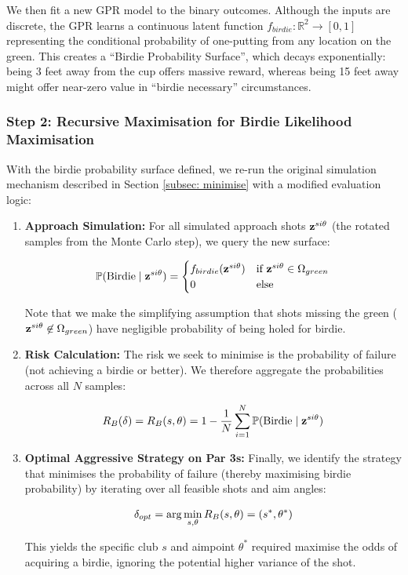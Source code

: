 \documentclass[11pt, letterpaper]{article}
\begin{document}
We then fit a new GPR model to the binary outcomes. Although the inputs are discrete, the GPR learns a continuous latent function $f_{birdie}: \mathbb{R}^2 \to [0,1] $ representing the conditional probability of one-putting from any location on the green. This creates a ``Birdie Probability Surface'', which decays exponentially: being 3 feet away from the cup offers massive reward, whereas being 15 feet away might offer near-zero value in ``birdie necessary'' circumstances.

\subsubsection{Step 2: Recursive Maximisation for Birdie Likelihood Maximisation}
With the birdie probability surface defined, we re-run the original simulation mechanism described in Section \ref{subsec: minimise} with a modified evaluation logic:

\begin{enumerate}
\item \textbf{Approach Simulation:} For all simulated approach shots $\mathbf{z}^{si\theta}$ (the rotated samples from the Monte Carlo step), we query the new surface:

\[
\mathbb{P}(\text{Birdie} \mid \mathbf{z}^{si\theta}) = \begin{cases}
    f_{birdie}(\mathbf{z}^{si\theta}) & \text{if } \mathbf{z}^{si\theta} \in \Omega_{green} \\
    0 & \text{else}
\end{cases}
\]

Note that we make the simplifying assumption that shots missing the green ($\mathbf{z}^{si\theta} \not\in \Omega_{green}$) have negligible probability of being holed for birdie.

\item \textbf{Risk Calculation:} The risk we seek to minimise is the probability of failure (not achieving a birdie or better). We therefore aggregate the probabilities across all $N$ samples:

$$R_{B}(\delta)= R_{B}(s, \theta) = 1 - \frac{1}{N} \sum_{i=1}^{N} \mathbb{P}(\text{Birdie} \mid \mathbf{z}^{si\theta})$$

\item \textbf{Optimal Aggressive Strategy on Par 3s:} Finally, we identify the strategy that minimises the probability of failure (thereby maximising birdie probability) by iterating over all feasible shots and aim angles:

$$\delta_{opt} = \arg \min_{s, \theta} R_B(s, \theta) = (s^*, \theta^*)$$

This yields the specific club $s$ and aimpoint $\theta^*$ required maximise the odds of acquiring a birdie, ignoring the potential higher variance of the shot.
\end{enumerate}
\end{document}
